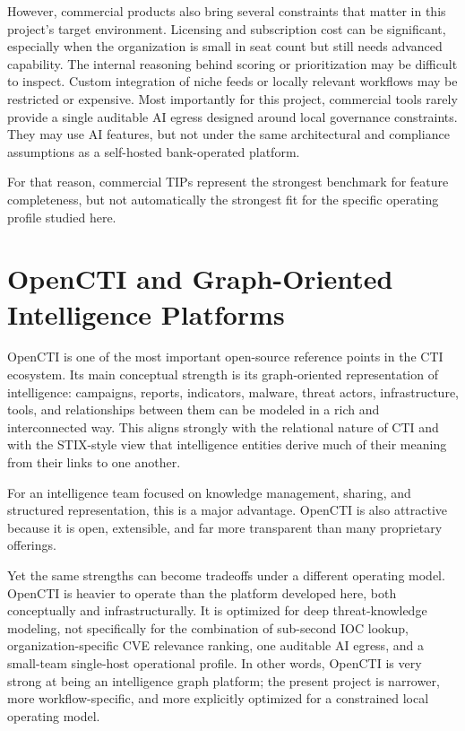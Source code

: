 However, commercial products also bring several constraints that matter in this project's target environment. Licensing and subscription cost can be significant, especially when the organization is small in seat count but still needs advanced capability. The internal reasoning behind scoring or prioritization may be difficult to inspect. Custom integration of niche feeds or locally relevant workflows may be restricted or expensive. Most importantly for this project, commercial tools rarely provide a single auditable AI egress designed around local governance constraints. They may use AI features, but not under the same architectural and compliance assumptions as a self-hosted bank-operated platform.

For that reason, commercial TIPs represent the strongest benchmark for feature completeness, but not automatically the strongest fit for the specific operating profile studied here.

\section{OpenCTI and Graph-Oriented Intelligence Platforms}
OpenCTI is one of the most important open-source reference points in the CTI ecosystem. Its main conceptual strength is its graph-oriented representation of intelligence: campaigns, reports, indicators, malware, threat actors, infrastructure, tools, and relationships between them can be modeled in a rich and interconnected way. This aligns strongly with the relational nature of CTI and with the STIX-style view that intelligence entities derive much of their meaning from their links to one another.

For an intelligence team focused on knowledge management, sharing, and structured representation, this is a major advantage. OpenCTI is also attractive because it is open, extensible, and far more transparent than many proprietary offerings.

Yet the same strengths can become tradeoffs under a different operating model. OpenCTI is heavier to operate than the platform developed here, both conceptually and infrastructurally. It is optimized for deep threat-knowledge modeling, not specifically for the combination of sub-second IOC lookup, organization-specific CVE relevance ranking, one auditable AI egress, and a small-team single-host operational profile. In other words, OpenCTI is very strong at being an intelligence graph platform; the present project is narrower, more workflow-specific, and more explicitly optimized for a constrained local operating model.

